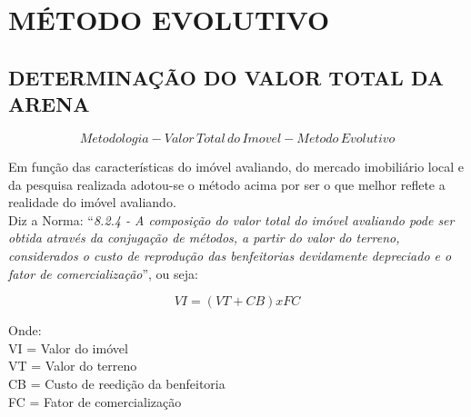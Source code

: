 \section{MÉTODO EVOLUTIVO}
\subsection{DETERMINAÇÃO DO VALOR TOTAL DA ARENA}
\begin{equation}
	Metodologia - Valor \, Total \, do \, Imovel - Metodo \, Evolutivo
\end{equation}

%
\hspace*{1.25 cm} Em função das características do imóvel avaliando, do mercado imobiliário local e da pesquisa realizada adotou-se o método acima por ser o que melhor reflete a realidade do imóvel avaliando.\\ 
%
\hspace*{1.25 cm} Diz a Norma: “\textit{8.2.4 - A composição do valor total do imóvel avaliando pode ser obtida através da conjugação de métodos, a partir do valor do terreno, considerados o custo de reprodução das benfeitorias devidamente depreciado e o fator de comercialização}”, ou seja:\\

\begin{minipage}[t!]{0.35\textwidth}
	\begin{equation}
		VI = (VT + CB) x FC  
	\end{equation}		
	
\end{minipage}\hfill
\begin{minipage}[t!]{0.5\textwidth}
	Onde:\\ 
	VI =	Valor do imóvel\\ 
	VT =	Valor do terreno\\ 
	CB =	Custo de reedição da benfeitoria\\ 
	FC =	Fator de comercialização\\ 
\end{minipage} 



